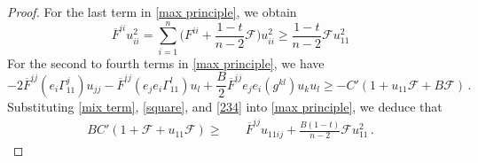 \documentclass[10pt,a4paper]{amsart}
\begin{document}
\begin{proof}
For the last term in \eqref{max principle}, we obtain
\begin{equation}\label{square}
\overline{F}^{ii}u_{ii}^{2}=\sum_{i=1}^{n}\Big( F^{ii}+\frac{1-t}{n-2}\mathcal{F}\Big)u_{ii}^{2}\geq \frac{1-t}{n-2}\mathcal{F} u_{11}^{2}
\end{equation}
For the second to fourth terms in \eqref{max principle}, we have
\begin{equation}\label{234}
-2\overline{F}^{ij}(e_{i}\Gamma_{11}^{j})u_{jj}-\overline{F}^{ij}(e_{j}e_{i}\Gamma_{11}^{l})u_{l} +\frac{B}{2}\overline{F}^{ij}e_{j}e_{i}(g^{kl})u_{k}u_{l}\geq - C'(1+u_{11}\mathcal{F}+B \mathcal{F})\,.
\end{equation}
Substituting \eqref{mix term}, \eqref{square}, and \eqref{234} into \eqref{max principle}, we deduce that
\begin{equation}\label{max principle v2}
\begin{split}
BC' (1+\mathcal{F}+u_{11}\mathcal{F} )\geq &\quad \overline{F}^{ij} u_{11ij}+\frac{B(1-t)}{n-2}\mathcal{F} u_{11}^{2}\,.
\end{split}
\end{equation}



\end{proof}
\end{document}
